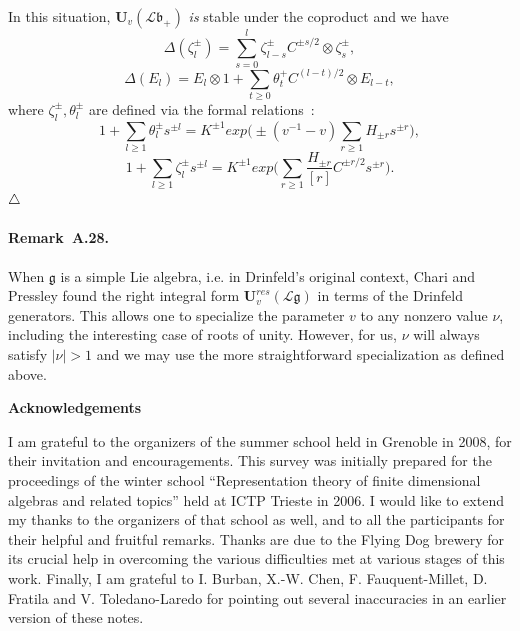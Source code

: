 \documentclass[a4paper,10pt]{amsart}
\def\U{\mathbf{U}}
\def\endexample{$\hfill \triangle$}
\def\g{\mathfrak{g}}
\def\bo{\mathfrak{b}}
\numberwithin{equation}{section}
\begin{document}
{In this situation, $\U_v(\mathcal{L}\bo_+)$ \textit{is} stable under the coproduct and we have
\begin{equation}\label{E:copp2}
\Delta(\zeta_{l}^{\pm})=\sum_{s=0}^l \zeta_{l-s}^{\pm} C^{\pm s/2}\otimes \zeta_{s}^{\pm},
\end{equation}
\begin{equation}\label{E:copp3}
\Delta(E_{l})=E_{l} \otimes 1 + \sum_{t \geq 0} \theta^+_{t}C^{(l-t)/2}\otimes E_{l-t},
\end{equation}
where $\zeta_{l}^{\pm}, \theta_{l}^{\pm}$ are defined via the formal relations~:
$$1+\sum_{l \geq 1} \theta_{l}^{\pm}s^{\pm l}= K^{\pm 1} exp\bigg(\pm (v^{-1}-v) \sum_{r \geq 1} H_{\pm r}s^{\pm r}\bigg),$$
$$1+\sum_{l \geq 1} \zeta_{l}^{\pm}s^{\pm l}= K^{\pm 1} exp\bigg( \sum_{r \geq 1} \frac{H_{\pm r}}{[r]}C^{\pm r/2} s^{\pm r}\bigg).$$
\endexample

\vspace{.15in}

\addtocounter{theo}{1}

\paragraph{\textbf{Remark~A.28.}} When $\g$ is a simple Lie algebra, i.e. in Drinfeld's original context, Chari and Pressley found the right integral form $\U_v^{res}(\mathcal{L}\g)$ in terms of the Drinfeld generators. This allows one to specialize the parameter $v$ to any nonzero value $\nu$, including the interesting case of roots of unity. However, for us, $\nu$ will always satisfy $|\nu|>1$ and we may use the more straightforward specialization as defined above.

\newpage

\centerline{\textbf{Acknowledgements}}

\vspace{.1in}

I am grateful to the organizers of the summer school held in Grenoble in 2008, for their invitation and encouragements.
This survey was initially prepared for the proceedings of the winter school ``Representation theory of finite dimensional algebras and related topics'' held at ICTP Trieste in 2006. I would like to extend my thanks to the organizers of that school as well, and to all the participants for their helpful and fruitful remarks. Thanks are due to the Flying Dog brewery for its crucial help in overcoming the various difficulties met at various stages of this work. Finally, I am grateful to I. Burban, X.-W. Chen, F. Fauquent-Millet, D. Fratila  and V. Toledano-Laredo for pointing out several inaccuracies in an earlier version of these notes.

}
\end{document}
